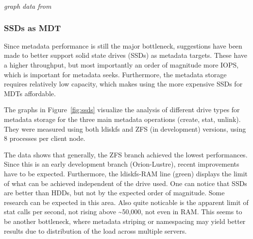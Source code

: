 \hfill{\scriptsize\emph{graph data from \cite{metadata-scaling}}}

\subsubsection{SSDs as MDT}

Since metadata performance is still the major bottleneck, suggestions have been
made to better support solid state drives (SSDs) as metadata targets. These have
a higher throughput, but most importantly an order of magnitude more IOPS, which
is important for metadata seeks. Furthermore, the metadata storage requires
relatively low capacity, which makes using the more expensive SSDs for MDTs
affordable.

The graphs in Figure~\ref{fig:ssds} visualize the analysis of different drive types for metadata
storage for the three main metadata operations (create, stat, unlink). They were
measured using both ldiskfs and ZFS (in development) versions, using 8
processes per client node.

The data shows that generally, the ZFS branch achieved the lowest performances.
Since this is an early development branch (Orion-Lustre), recent improvements
have to be expected. Furthermore, the ldiskfs-RAM line (green) displays the
limit of what can be achieved independent of the drive used. One can notice that
SSDs are better than HDDs, but not by the expected order of magnitude. Some
research can be expected in this area. Also quite noticable is the apparent limit
of stat calls per second, not rising above \textasciitilde50,000, not even in RAM.
This seems to be another bottleneck, where metadata striping or namespacing may
yield better results due to distribution of the load across multiple servers.

